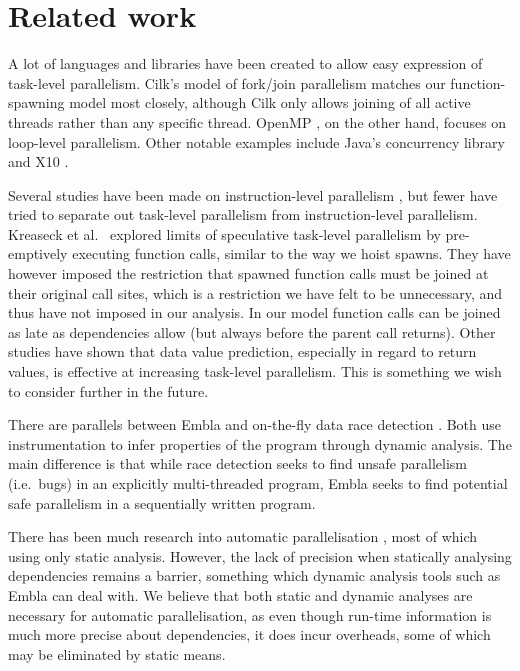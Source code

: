 \section{Related work}

A lot of languages and libraries have been created to allow easy expression of task-level parallelism.
Cilk's \cite{blumofe96cilk} model of fork/join parallelism matches our function-spawning model most closely, although Cilk only allows joining of all active threads rather than any specific thread.
OpenMP \cite{dagum98openmp}, on the other hand, focuses on loop-level parallelism.
Other notable examples include Java's concurrency library \cite{lea00java} and  X10 \cite{charles05x10}.

Several studies have been made on instruction-level parallelism \cite{wall91limits, postiff99limits, austin92dynamic, lam92limits, mak09limits}, but fewer have tried to separate out task-level parallelism from instruction-level parallelism.
Kreaseck et al.\ \cite{Kreaseck00limitsof} explored limits of speculative task-level parallelism by pre-emptively executing function calls, similar to the way we hoist spawns.
They have however imposed the restriction that spawned function calls must be joined at their original call sites, which is a restriction we have felt to be unnecessary, and thus have not imposed in our analysis.
In our model function calls can be joined as late as dependencies allow (but always before the parent call returns).
Other studies \cite{warg01limits, oplinger99insearch} have shown that data value prediction, especially in regard to return values, is effective at increasing task-level parallelism.
This is something we wish to consider further in the future.

There are parallels between Embla and on-the-fly data race detection \cite{MellorCrummey91onthefly, ha02space, savage97eraser}.
Both use instrumentation to infer properties of the program through dynamic analysis.
The main difference is that while race detection seeks to find unsafe parallelism (i.e.\ bugs) in an explicitly multi-threaded program, Embla seeks to find potential safe parallelism in a sequentially written program.

There has been much research into automatic parallelisation \cite{kennedy02optimizing, Blume94polaris, ottoni05automatic, ottoni07global}, most of which using only static analysis.
However, the lack of precision when statically analysing dependencies remains a barrier, something which dynamic analysis tools such as Embla can deal with.
We believe that both static and dynamic analyses are necessary for automatic parallelisation, as even though run-time information is much more precise about dependencies, it does incur overheads, some of which may be eliminated by static means.

